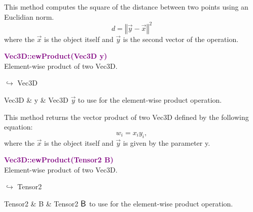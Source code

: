 This method computes the square of the distance between two points using an Euclidian norm.
\begin{equation*}
d = {\left\Vert \overrightarrow{y} - \overrightarrow{x} \right\Vert}^2
\end{equation*}
where the $\overrightarrow{x}$ is the object itself and $\overrightarrow{y}$ is the second vector of the operation.

\textcolor{purple}{\textbf{Vec3D::ewProduct(Vec3D y)}}\label{Vec3D::ewProduct(Vec3D y)}\\
Element-wise product of two Vec3D.\vspace*{-0.5em}
\begin{tcolorbox}[grow to left by=-1cm, width=\textwidth-1cm,myArgs,tabularx={l|R}]
$\hookrightarrow$ Vec3D
\end{tcolorbox}

\begin{tcolorbox}[width=\textwidth,myArgs,tabularx={ll|R}]
Vec3D & y & Vec3D $\overrightarrow{y}$ to use for the element-wise product operation.
\end{tcolorbox}

This method returns the vector product of two Vec3D defined by the following equation:
\begin{equation*}
w_i = x_i y_i,
\end{equation*}
where the $\overrightarrow{x}$ is the object itself and $\overrightarrow{y}$ is given by the parameter y.

\textcolor{purple}{\textbf{Vec3D::ewProduct(Tensor2 B)}}\label{Vec3D::ewProduct(Tensor2 B)}\\
Element-wise product of two Vec3D.\vspace*{-0.5em}
\begin{tcolorbox}[grow to left by=-1cm, width=\textwidth-1cm,myArgs,tabularx={l|R}]
$\hookrightarrow$ Tensor2
\end{tcolorbox}

\begin{tcolorbox}[width=\textwidth,myArgs,tabularx={ll|R}]
Tensor2 & B & Tensor2 $\mbox{\large\ensuremath{\mathsf{B}}}$ to use for the element-wise product operation.
\end{tcolorbox}

